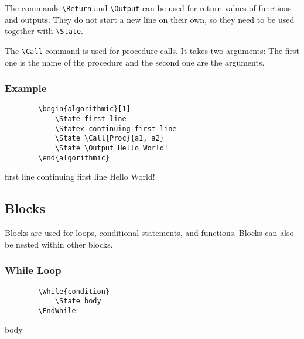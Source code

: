 \documentclass[11pt,a4paper,USenglish]{article}
\begin{document}
The commands \verb|\Return| and \verb|\Output| can be used for return values of functions and outputs. They do not start a new line on their own, so they need to be used together with \verb|\State|.

The \verb|\Call| command is used for procedure calls. It takes two arguments: The first one is the name of the procedure and the second one are the arguments.

\subsubsection*{Example}
\begin{minipage}[t]{0.45\textwidth}
	\begin{verbatim}
		\begin{algorithmic}[1]
		    \State first line
		    \Statex continuing first line
		    \State \Call{Proc}{a1, a2}
		    \State \Output Hello World!
		\end{algorithmic}
	\end{verbatim}
\end{minipage}
\hfill
\begin{minipage}[t]{0.45\textwidth}
	\begin{algorithmic}[1]
		\State first line
		\Statex continuing first line
		\State {}
		\State \Output Hello World!
	\end{algorithmic}
\end{minipage}


\subsection{Blocks}
Blocks are used for loops, conditional statements, and functions. Blocks can also be nested within other blocks.

\subsubsection{While Loop}
\begin{minipage}[t]{0.45\textwidth}
	\begin{verbatim}
		\While{condition}
		    \State body
		\EndWhile
	\end{verbatim}
\end{minipage}
\hfill
\begin{minipage}[t]{0.45\textwidth}
	\begin{algorithmic}
		    \State body
		\EndWhile
	\end{algorithmic}
\end{minipage}
\end{document}
